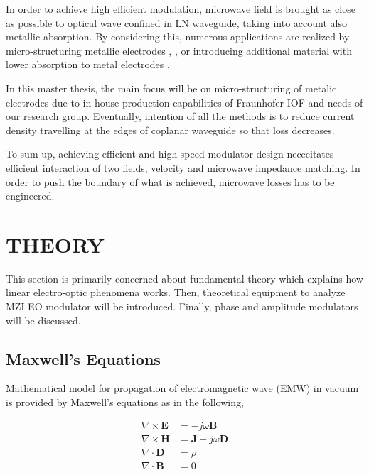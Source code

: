 \documentclass[thesis]{deutez}
\begin{document}
	In order to achieve high efficient modulation, microwave field is brought as close as possible to optical wave confined in LN waveguide, taking into account also metallic absorption. By considering this, numerous applications are realized by micro-structuring metallic electrodes \cite{24}, \cite{26}, \cite{28} or introducing additional material with lower absorption to metal electrodes  \cite{25}, \cite{27}
	
	In this master thesis, the main focus will be on micro-structuring of metalic electrodes due to in-house production capabilities of Fraunhofer IOF and needs of our research group. Eventually, intention of all the methods is to reduce current density travelling at the edges of coplanar waveguide so that loss decreases. 
	
	To sum up, achieving efficient and high speed modulator design nececitates efficient interaction of two fields, velocity and microwave impedance matching. In order to push the boundary of what is achieved, microwave losses has to be engineered.      
        
\chapter{THEORY}

    This section is primarily concerned about fundamental theory which explains how linear electro-optic phenomena works. Then, theoretical equipment to analyze MZI EO modulator will be introduced. Finally, phase and amplitude modulators will be discussed.

    \section{Maxwell's Equations}

    Mathematical model for propagation of electromagnetic wave (EMW) in vacuum is provided by Maxwell's equations as in the following,


    \begin{subequations}\label{eq:maxwell_def}
        \begin{align}
            \nabla \times \mathbf{E} &= -j\omega \mathbf{B} \label{eq:maxwell_def_a} \\
            \nabla \times \mathbf{H} &= \mathbf{J} + j\omega \mathbf{D} \label{eq:maxwell_def_b} \\
            \nabla \cdot \mathbf{D} &= \rho \label{eq:maxwell_def_c} \\
            \nabla \cdot \mathbf{B} &= 0 \label{eq:maxwell_def_d}
        \end{align}
    \end{subequations}
\end{document}
